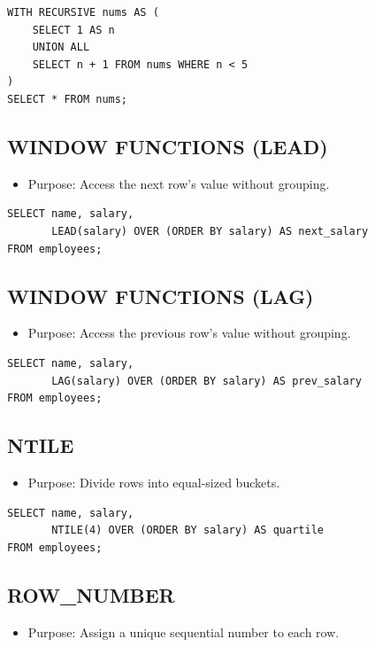 \documentclass[10pt]{article}
\begin{document}
\begin{verbatim}
WITH RECURSIVE nums AS (
    SELECT 1 AS n
    UNION ALL
    SELECT n + 1 FROM nums WHERE n < 5
)
SELECT * FROM nums;
\end{verbatim}

\subsection{WINDOW FUNCTIONS (LEAD)}
\begin{itemize}
    \item Purpose: Access the next row's value without grouping.
\end{itemize}

\begin{verbatim}
SELECT name, salary,
       LEAD(salary) OVER (ORDER BY salary) AS next_salary
FROM employees;
\end{verbatim}

\subsection{WINDOW FUNCTIONS (LAG)}
\begin{itemize}
    \item Purpose: Access the previous row's value without grouping.
\end{itemize}

\begin{verbatim}
SELECT name, salary,
       LAG(salary) OVER (ORDER BY salary) AS prev_salary
FROM employees;
\end{verbatim}

\subsection{NTILE}
\begin{itemize}
    \item Purpose: Divide rows into equal-sized buckets.
\end{itemize}

\begin{verbatim}
SELECT name, salary,
       NTILE(4) OVER (ORDER BY salary) AS quartile
FROM employees;
\end{verbatim}

\subsection{ROW\_NUMBER}
\begin{itemize}
    \item Purpose: Assign a unique sequential number to each row.
\end{itemize}
\end{document}
